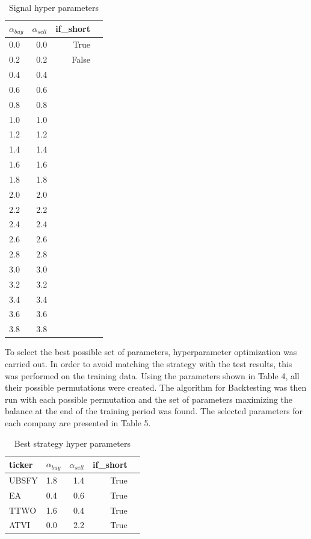 \documentclass[review]{elsarticle} %
\begin{document}
\begin{table}[H]
\centering
\caption{Signal hyper parameters}
\begin{tabular}{lrrl}
\toprule
  $\alpha_{buy}$ &  $\alpha_{sell}$  & if\_short \\
\midrule
        0.0 &           0.0 &     True \\
         0.2 &           0.2 &    False \\
         0.4 &           0.4  \\
         0.6 &           0.6  \\
          0.8 &           0.8  \\
          1.0 &           1.0  \\
          1.2 &           1.2  \\
          1.4 &           1.4  \\
          1.6 &           1.6  \\
          1.8 &           1.8  \\
         2.0 &           2.0  \\
          2.2 &           2.2  \\
          2.4 &           2.4  \\
          2.6 &           2.6  \\
          2.8 &           2.8  \\
          3.0 &           3.0  \\
          3.2 &           3.2  \\
          3.4 &           3.4  \\
          3.6 &           3.6  \\
          3.8 &           3.8  \\
\bottomrule
\end{tabular}
\end{table}

To select the best possible set of parameters, hyperparameter optimization was carried out. In order to avoid matching the strategy with the test results, this was performed on the training data. Using the parameters shown in Table 4, all their possible permutations were created. The algorithm for Backtesting was then run with each possible permutation and the set of parameters maximizing the balance at the end of the training period was found. The selected parameters for each company are presented in Table 5. 

\begin{table}[H]
\centering
\caption{Best strategy hyper parameters}
\begin{tabular}{llrrl}
\toprule
 ticker &  $\alpha_{buy}$ &  $\alpha_{sell}$  &  if\_short \\
\midrule
  UBSFY &          1.8 &           1.4 &      True \\
     EA &          0.4 &           0.6 &      True \\
   TTWO &          1.6 &           0.4 &      True \\
   ATVI &          0.0 &           2.2 &      True \\
\bottomrule
\end{tabular}
\end{table}
\end{document}
